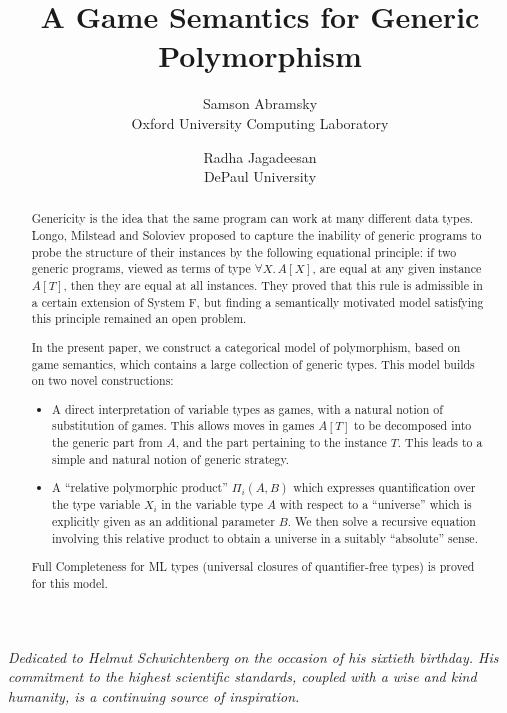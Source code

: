 \documentclass[a4paper,11pt]{article}
\title{A Game Semantics for Generic Polymorphism}
\author{Samson Abramsky\\
Oxford University Computing Laboratory\\
\and
Radha Jagadeesan\\
DePaul University}
\date{}
\begin{document}
\maketitle

\begin{center}
\textit{Dedicated to Helmut Schwichtenberg on the occasion of his
  sixtieth birthday. His commitment to the highest scientific
  standards, coupled with a wise and kind humanity, is a continuing
  source of inspiration.}
\end{center}

\begin{abstract}
Genericity is the idea that the same program can work at many
different data types.  Longo, Milstead and Soloviev proposed to capture the
inability of generic programs to probe the structure of their
instances by the following equational principle: if two generic
programs, viewed as terms of type $\forall X. \, A[X]$, are equal
at any given instance $A[T]$, then they are equal at all
instances. They proved that this rule is admissible in a certain
extension of System F, but finding a semantically motivated model
satisfying this principle remained an open problem.

In the present paper, we construct a categorical
model of polymorphism, based on game semantics, which contains a
large collection of generic types. This model builds on two novel
constructions:
\begin{itemize}
\item A direct interpretation of variable types as games, with a
  natural notion of substitution of games. This allows moves in
  games $A[T]$ to be decomposed into the generic part from $A$, and
  the part pertaining to the instance $T$. This leads to a
  simple and natural notion of generic strategy.

\item A ``relative polymorphic product''
  $\Pi_i (A, B)$ which expresses quantification over the type variable
  $X_i$ in the variable type $A$ with respect to a ``universe'' which
  is explicitly given as an additional parameter $B$. We then solve a
  recursive equation involving this relative product to obtain a
  universe in a suitably ``absolute'' sense.
  \end{itemize}
Full Completeness for ML types (universal closures of
quantifier-free types) is proved for this model.
\end{abstract}
\end{document}
